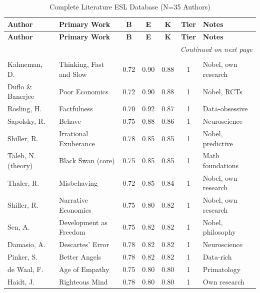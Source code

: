 \documentclass[11pt,a4paper]{article}
\begin{document}
\begin{longtable}{p{3.5cm}p{4cm}ccccp{2cm}}
\caption{Complete Literature ESL Database (N=35 Authors)} \\
\toprule
\textbf{Author} & \textbf{Primary Work} & \textbf{B} & \textbf{E} & \textbf{K} & \textbf{Tier} & \textbf{Notes} \\
\midrule
\endfirsthead
\toprule
\textbf{Author} & \textbf{Primary Work} & \textbf{B} & \textbf{E} & \textbf{K} & \textbf{Tier} & \textbf{Notes} \\
\midrule
\endhead
\midrule
\multicolumn{7}{r}{\textit{Continued on next page}} \\
\endfoot
\bottomrule
\endlastfoot

\multicolumn{7}{l}{\textbf{Tier 1: Scientific Foundation (K $\geq$ 0.80)}} \\
\midrule
Kahneman, D. & Thinking, Fast and Slow & 0.72 & 0.90 & 0.88 & 1 & Nobel, own research \\
Duflo \& Banerjee & Poor Economics & 0.72 & 0.90 & 0.88 & 1 & Nobel, RCTs \\
Rosling, H. & Factfulness & 0.70 & 0.92 & 0.87 & 1 & Data-obsessive \\
Sapolsky, R. & Behave & 0.75 & 0.88 & 0.86 & 1 & Neuroscience \\
Shiller, R. & Irrational Exuberance & 0.78 & 0.85 & 0.85 & 1 & Nobel, predictive \\
Taleb, N. (theory) & Black Swan (core) & 0.75 & 0.85 & 0.85 & 1 & Math foundations \\
Thaler, R. & Misbehaving & 0.72 & 0.85 & 0.84 & 1 & Nobel, own research \\
Shiller, R. & Narrative Economics & 0.75 & 0.80 & 0.82 & 1 & Nobel, own research \\
Sen, A. & Development as Freedom & 0.75 & 0.82 & 0.82 & 1 & Nobel, philosophy \\
Damasio, A. & Descartes' Error & 0.78 & 0.82 & 0.82 & 1 & Neuroscience \\
Pinker, S. & Better Angels & 0.78 & 0.82 & 0.82 & 1 & Data-rich \\
de Waal, F. & Age of Empathy & 0.75 & 0.80 & 0.80 & 1 & Primatology \\
Haidt, J. & Righteous Mind & 0.78 & 0.80 & 0.80 & 1 & Own research \\


\end{longtable}
\end{document}
